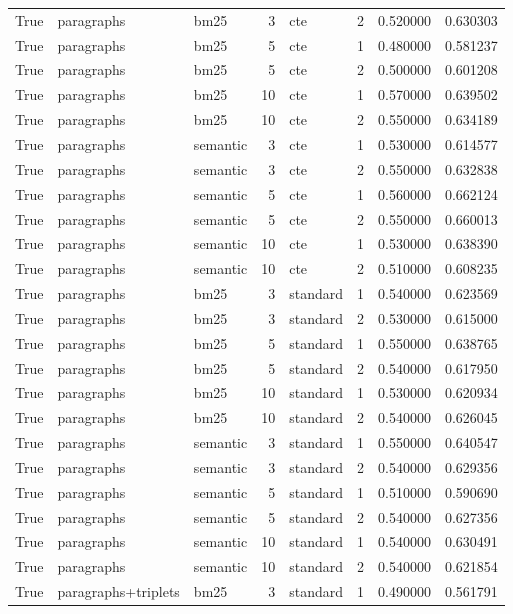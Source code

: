 \begin{tabular}{rllrlrrr}
True & paragraphs & bm25 & 3 & cte & 2 & 0.520000 & 0.630303 \\
True & paragraphs & bm25 & 5 & cte & 1 & 0.480000 & 0.581237 \\
True & paragraphs & bm25 & 5 & cte & 2 & 0.500000 & 0.601208 \\
True & paragraphs & bm25 & 10 & cte & 1 & 0.570000 & 0.639502 \\
True & paragraphs & bm25 & 10 & cte & 2 & 0.550000 & 0.634189 \\
True & paragraphs & semantic & 3 & cte & 1 & 0.530000 & 0.614577 \\
True & paragraphs & semantic & 3 & cte & 2 & 0.550000 & 0.632838 \\
True & paragraphs & semantic & 5 & cte & 1 & 0.560000 & 0.662124 \\
True & paragraphs & semantic & 5 & cte & 2 & 0.550000 & 0.660013 \\
True & paragraphs & semantic & 10 & cte & 1 & 0.530000 & 0.638390 \\
True & paragraphs & semantic & 10 & cte & 2 & 0.510000 & 0.608235 \\
True & paragraphs & bm25 & 3 & standard & 1 & 0.540000 & 0.623569 \\
True & paragraphs & bm25 & 3 & standard & 2 & 0.530000 & 0.615000 \\
True & paragraphs & bm25 & 5 & standard & 1 & 0.550000 & 0.638765 \\
True & paragraphs & bm25 & 5 & standard & 2 & 0.540000 & 0.617950 \\
True & paragraphs & bm25 & 10 & standard & 1 & 0.530000 & 0.620934 \\
True & paragraphs & bm25 & 10 & standard & 2 & 0.540000 & 0.626045 \\
True & paragraphs & semantic & 3 & standard & 1 & 0.550000 & 0.640547 \\
True & paragraphs & semantic & 3 & standard & 2 & 0.540000 & 0.629356 \\
True & paragraphs & semantic & 5 & standard & 1 & 0.510000 & 0.590690 \\
True & paragraphs & semantic & 5 & standard & 2 & 0.540000 & 0.627356 \\
True & paragraphs & semantic & 10 & standard & 1 & 0.540000 & 0.630491 \\
True & paragraphs & semantic & 10 & standard & 2 & 0.540000 & 0.621854 \\
True & paragraphs+triplets & bm25 & 3 & standard & 1 & 0.490000 & 0.561791 \\

\end{tabular}
